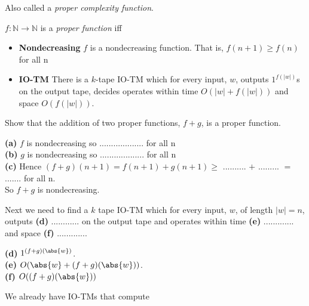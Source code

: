 Also called a \textit{proper complexity function}. 

$f:\mathbb{N} \rightarrow \mathbb{N}$ is a \textit{proper function} iff

\begin{itemize}   
\renewcommand{\labelitemi}{$\Box$}
\item \textbf{Nondecreasing} 
$f$ is a nondecreasing function. That is, $f(n+1) \geqslant f(n)$ for all n
\item \textbf{IO-TM} 
There is a $k$-tape IO-TM which for every input, $w$, 
outputs $1^{f(|w|)}$s on the output tape, decides operates within time $O(|w| + f(|w|))$ 
and space $O(f(|w|))$. 
\end{itemize} 


\frmrule

\begin{example}
Show that the addition of two proper functions, $f + g$, is a proper function.

\textbf{(a)} $f$ is nondecreasing so ................... for all n \\
\textbf{(b)} $g$ is nondecreasing so ................... for all n \\
\textbf{(c)} Hence $(f + g)(n+1) = f(n+1) + g(n+1) \geqslant$ .......... $+$ ......... $ = $ ....... for all n. \\
So $f + g$ is nondecreasing. 

Next we need to find a $k$ tape IO-TM which for 
every input, $w$, of length $|w| = n$, outputs \textbf{(d)} ............ 
on the output tape and operates within time \textbf{(e)} ............. 
and space \textbf{(f)} ............. 


\end{example}



{
\textbf{(d)} $1^{(f+g)(\abs{w})}$. \\
\textbf{(e)} $O(\abs{w} + (f+g)(\abs{w}))$. \\
\textbf{(f)} $O((f+g)(\abs{w}))$ 
}

We already have IO-TMs that compute 


